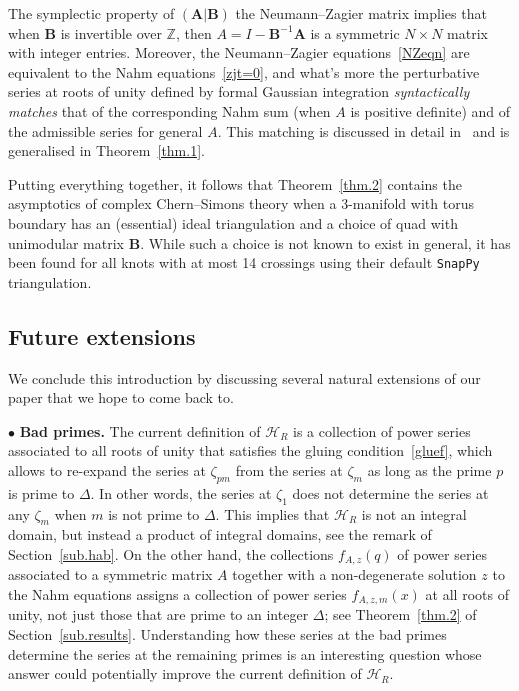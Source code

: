 \documentclass[12pt,reqno]{amsart}
\theoremstyle{definition}
\def\BZ{\mathbb Z}
\def\calH{\mathcal H}
\def\z{\zeta}
\def\Phitof{f}
\begin{document}
The symplectic property of $(\boldsymbol{A}|\boldsymbol{B})$ the Neumann--Zagier
matrix implies that when $\boldsymbol{B}$ is invertible over $\BZ$, then
$A=I-\boldsymbol{B}^{-1}\boldsymbol{A}$ is a symmetric $N \times N$ matrix with
integer entries. Moreover, the Neumann--Zagier equations~\eqref{NZeqn} are equivalent
to the Nahm equations~\eqref{zjt=0}, and what's more the perturbative series at
roots of unity defined by formal Gaussian integration \emph{syntactically matches} that
of the corresponding Nahm sum (when $A$ is positive definite) and of the admissible
series for general $A$. This matching is discussed in detail in~\cite{GZ:nahm} and is generalised in Theorem~\ref{thm.1}.

Putting everything together, it follows that Theorem~\ref{thm.2} contains the
asymptotics of complex Chern--Simons theory when a 3-manifold with torus boundary
has an (essential) ideal triangulation and a choice of quad with unimodular matrix
$\boldsymbol{B}$. While such a choice is not known to exist in general, it has
been found for all knots with at most 14 crossings using their
default \texttt{SnapPy} triangulation. 

\subsection{Future extensions}
\label{sub.further}

We conclude this introduction by discussing several natural extensions of
our paper that we hope to come back to.

\noindent $\bullet$ {\bf Bad primes.}
The current definition of $\calH_R$ is a collection of power series associated to
all roots of unity that satisfies the gluing condition~\eqref{gluef}, which allows
to re-expand the series at $\z_{pm}$ from the series at $\z_m$ as long as the prime
$p$ is prime to $\Delta$. In other words, the series at $\z_1$ does not determine
the series at any $\z_m$ when $m$ is not prime to $\Delta$. This implies that
$\calH_R$ is not an integral domain, but instead a product of integral domains,
see the remark
of Section~\ref{sub.hab}. On the other hand, the collections $\Phitof_{A,z}(q)$ of
power series associated to a symmetric matrix $A$ together with a non-degenerate
solution $z$ to the Nahm equations assigns a collection of power series
$\Phitof_{A,z,m}(x)$ at all roots of unity, not just those that are prime to an
integer $\Delta$; see Theorem~\ref{thm.2} of Section~\ref{sub.results}. Understanding
how these series at
the bad primes determine the series at the remaining primes is an interesting
question whose answer could potentially improve the current definition of $\calH_R$.
\end{document}
